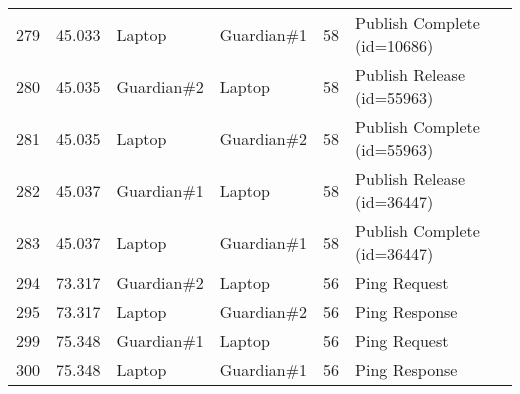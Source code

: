 \begin{table}[]
\begin{tabular}{llllll}
279 & 45.033 & Laptop      & Guardian\#1 & 58     & Publish Complete (id=10686)                                                                                                            \\
280 & 45.035 & Guardian\#2 & Laptop      & 58     & Publish Release (id=55963)                                                                                                             \\
281 & 45.035 & Laptop      & Guardian\#2 & 58     & Publish Complete (id=55963)                                                                                                            \\
282 & 45.037 & Guardian\#1 & Laptop      & 58     & Publish Release (id=36447)                                                                                                             \\
283 & 45.037 & Laptop      & Guardian\#1 & 58     & Publish Complete (id=36447)                                                                                                            \\
294 & 73.317 & Guardian\#2 & Laptop      & 56     & Ping Request                                                                                                                           \\
295 & 73.317 & Laptop      & Guardian\#2 & 56     & Ping Response                                                                                                                          \\
299 & 75.348 & Guardian\#1 & Laptop      & 56     & Ping Request                                                                                                                           \\
300 & 75.348 & Laptop      & Guardian\#1 & 56     & Ping Response                                                                                                                         
\end{tabular}
\end{table}